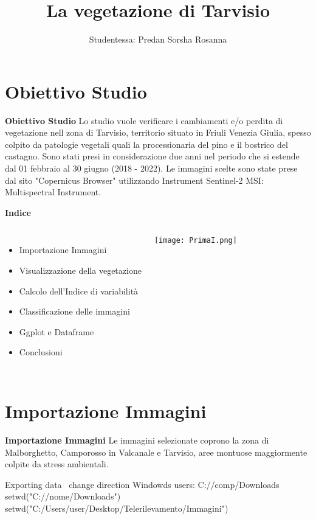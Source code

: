 \documentclass{beamer}
\title{\Large\textbf{La vegetazione di Tarvisio}}
\author{Studentessa: Predan Sorsha Rosanna }
\begin{document}
\maketitle

\AtBeginSection[] 


\section{Obiettivo Studio}

\begin{frame}
{\Large\textbf{Obiettivo Studio}}
 Lo studio vuole verificare i cambiamenti e/o perdita di vegetazione nell zona di Tarvisio, territorio situato in Friuli Venezia Giulia, spesso colpito da patologie vegetali quali la processionaria del pino e il bostrico del castagno. Sono stati presi in considerazione due anni nel periodo che si estende dal 01 febbraio al 30 giugno (2018 - 2022). Le immagini scelte sono state prese dal sito "Copernicus Browser" utilizzando Instrument Sentinel-2 MSI: Multispectral Instrument.
\end{frame}

\begin{frame}
{\Large\textbf{Indice}}
\begin{columns}
 \begin{itemize}
     \item Importazione Immagini
     \item Visualizzazione della vegetazione
     \item Calcolo dell'Indice di variabilità
     \item Classificazione delle immagini
     \item Ggplot e Dataframe
     \item Conclusioni
 \end{itemize}
    \texttt{[image: PrimaI.png]}
\end{columns}
\end{frame}

\section{Importazione Immagini}

\begin{frame}
{\Large\textbf{Importazione Immagini}}
Le immagini selezionate coprono la zona di Malborghetto, Camporosso in Valcanale e Tarvisio, aree montuose maggiormente colpite da stress ambientali.

\vspace{+1cm}
Exporting data
\ change direction
Windowds users: C://comp/Downloads
setwd("C://nome/Downloads")
setwd("C:/Users/user/Desktop/Telerilevamento/Immagini")
\end{frame}
\end{document}
